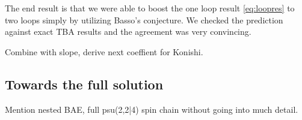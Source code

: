 The end result is that we were able to boost the one loop result \ref{eq:loopres} to two loops simply by utilizing Basso's conjecture. We checked the prediction against exact TBA results and the agreement was very convincing.


Combine with slope, derive next coeffient for Konishi.

\subsection{Towards the full solution}

Mention nested BAE, full psu(2,2|4) spin chain without going into much detail.
